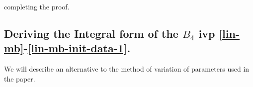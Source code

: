 \documentclass[12pt,reqno]{amsart}
\numberwithin{equation}{section}  %
\numberwithin{figure}{section}
\newcommand{\rr}{\mathbb{R}}
\newcommand{\zz}{\mathbb{Z}}
\newcommand{\wh}{\widehat}
\newcommand{\wt}{\widetilde}
\theoremstyle{plain}
\theoremstyle{definition}
\theoremstyle{remark}
\begin{document}
%
%
completing the proof. \qquad \qedsymbol
%
%
\subsection{Deriving the Integral form of the $B_{4}$ ivp
\eqref{lin-mb}-\eqref{lin-mb-init-data-1}.} 
\label{ssec:integral-form-deriv}
We will describe an alternative to the method of variation of parameters used in
the paper. 
%
%
\end{document}
